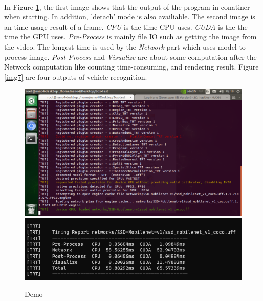 \documentclass{article}
\begin{document}
        \paragraph{}
        In Figure \ref{img5}, the first image shows that the output of the program in conatiner when starting. In addition, 'detach' mode is also availiable. The second image is an time usage result of a frame. \textit{CPU} is the time CPU uses. \textit{CUDA} is the the time the GPU uses. \textit{Pre-Process} is mainly file IO such as getting the image from the video.  The longest time is used by the \textit{Network} part which uses model to process image. \textit{Post-Process} and \textit{Visualize} are about some computation after the Network computation like counting time-consuming, and rendering result. Figure \ref{img7} are four outputs of vehicle recognition. 
        \begin{figure}[H]
            \centering
            \includegraphics[width=.6\textwidth]{img/report11.png}
            \includegraphics[width=.6\textwidth]{img/report6.png}
            \caption{Demo}
            \label{img5}
        \end{figure}
\end{document}
